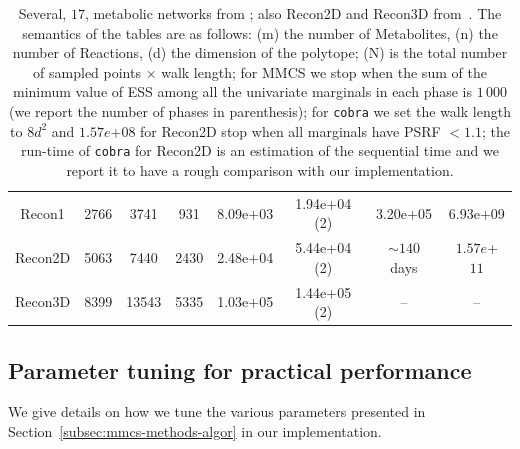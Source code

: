 \begin{table}[t]
\begin{tabular}{|c||c|c|c||c|c||c|c|}
      Recon1 & 2766 & 3741 & 931 & 8.09e+03 & 1.94e+04 (2) & 3.20e+05  & 6.93e+09 \\
      Recon2D & 5063 & 7440 & 2430 & 2.48e+04  &  5.44e+04 (2)  & $\sim 140$ days & $1.57e$+$11$   \\
      Recon3D  & 8399 & 13543 & 5335 & 1.03e+05 &  1.44e+05 (2) & -- & -- \\
      \hline
      \end{tabular}
      \caption[Recon2 and Recond3D distribution comparison]{\label{tab:results1} 
      Several, $17$, metabolic networks from 
         \citep{king2016bigg}; also  Recon2D and Recon3D from~\citep{noronha2019virtual}.
         The semantics of the tables are as follows: (m) the number of Metabolites,
         (n) the number of Reactions, %
         (d) the dimension of the polytope; (N) is the total number of sampled
         points $\times$ walk length; for MMCS we stop when the sum of the minimum
         value of ESS among all the univariate marginals in each phase is $1\,000$
         (we report the number of phases in parenthesis); for \texttt{cobra} we set the
         walk length to $8d^2$ and $1.57e$+$08$ for Recon2D
         stop when all marginals have PSRF $< 1.1$; the run-time of \texttt{cobra} for
         Recon2D is an estimation of the sequential time and we report it to have a
         rough comparison with our implementation.}
   \end{table}



 \subsection{Parameter tuning for practical performance}\label{subsec:implementation}

   We give details on how we tune the various parameters presented 
   in Section~\ref{subsec:mmcs-methods-algor} in our implementation.

